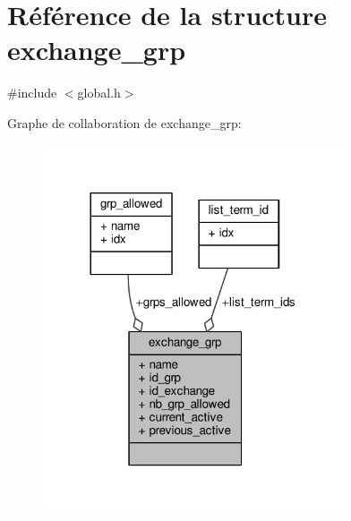 \hypertarget{structexchange__grp}{\section{Référence de la structure exchange\+\_\+grp}
\label{structexchange__grp}
}


{\ttfamily \#include $<$global.\+h$>$}



Graphe de collaboration de exchange\+\_\+grp\+:\nopagebreak
\begin{figure}[H]
\begin{center}
\leavevmode
\includegraphics[width=252pt]{structexchange__grp__coll__graph}
\end{center}
\end{figure}

